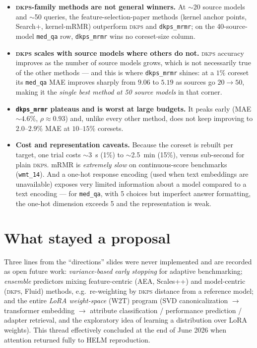 \documentclass[11pt]{report}
\newcommand{\code}[1]{\texttt{#1}}
\begin{document}
\begin{itemize}[nosep]
  \item \textbf{\textsc{dkps}-family methods are not general winners.} At $\sim$20
        source models and $\sim$50 queries, the feature-selection-paper methods
        (kernel anchor points, Search+, kernel-mRMR) outperform \textsc{dkps} and
        \code{dkps\_mrmr}; on the 40-source-model \code{med\_qa} row,
        \code{dkps\_mrmr} wins no coreset-size column.
  \item \textbf{\textsc{dkps} scales with source models where others do not.}
        \textsc{dkps} accuracy improves as the number of source models grows, which
        is not necessarily true of the other methods --- and this is where
        \code{dkps\_mrmr} shines: at a $1\%$ coreset its \code{med\_qa} MAE improves
        sharply from $9.06$ to $5.19$ as sources go $20\to50$, making it the
        \emph{single best method at 50 source models} in that corner.
  \item \textbf{\code{dkps\_mrmr} plateaus and is worst at large budgets.} It peaks
        early (MAE $\sim\!4.6\%$, $\rho\approx0.93$) and, unlike every other method,
        does not keep improving to $2.0$--$2.9\%$ MAE at $10$--$15\%$ coresets.
  \item \textbf{Cost and representation caveats.} Because the coreset is rebuilt per
        target, one trial costs $\sim$3~s (1\%) to $\sim$2.5~min (15\%), versus
        sub-second for plain \textsc{dkps}. mRMR is \emph{extremely slow} on
        continuous-score benchmarks (\code{wmt\_14}). And a one-hot response
        encoding (used when text embeddings are unavailable) exposes very limited
        information about a model compared to a text encoding --- for \code{med\_qa},
        with 5 choices but imperfect answer formatting, the one-hot dimension
        exceeds 5 and the representation is weak.
\end{itemize}

\section{What stayed a proposal}

Three lines from the ``directions'' slides were never implemented and are recorded
as open future work: \emph{variance-based early stopping} for adaptive
benchmarking; \emph{ensemble} predictors mixing feature-centric (AEA, Scales++) and
model-centric (\textsc{dkps}, Fluid) methods, e.g.\ re-weighting by \textsc{dkps}
distance from a reference model; and the entire \emph{LoRA weight-space} (W2T)
program (SVD canonicalization $\to$ transformer embedding $\to$ attribute
classification / performance prediction / adapter retrieval, and the exploratory
idea of learning a distribution over LoRA weights). This thread effectively
concluded at the end of June 2026 when attention returned fully to HELM
reproduction.
\end{document}
